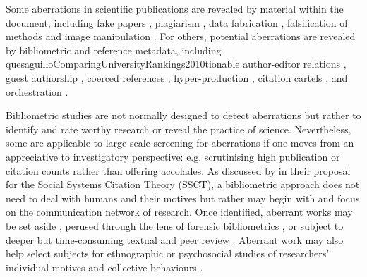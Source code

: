 \documentclass[10pt]{article}
\begin{document}
Some aberrations in scientific publications are revealed by material within the document, including fake papers \citep{elseFightFakepaperFactories2021}, plagiarism \citep{longRespondingPossiblePlagiarism2009}, data fabrication \citep{brownIssuesDataAnalyses2018}, falsification of methods \citep{simonsohnJustPostIt2013} and image manipulation \citep{bikPrevalenceInappropriateImage2016}. For others, potential aberrations are revealed by bibliometric and reference metadata, including quesaguilloComparingUniversityRankings2010tionable author-editor relations \citep{banksElsevierChallengedJournal2009}, guest authorship \citep{khezrVexingPersistentProblem2022}, coerced references \citep{straubJournalSelfCitationVI2009}, hyper-production \citep{ioannidisFeaturesSignalsPrecocious2024a}, citation cartels \citep{safonScreeningArticlesCitation2025}, and orchestration \citep{evdaimonMetricsDetectSmallScale2024}.

Bibliometric studies are not normally designed to detect aberrations but rather to identify and rate worthy research or reveal the practice of science. Nevertheless, some are applicable to large scale screening for aberrations if one moves from an appreciative to investigatory perspective: e.g. scrutinising high publication or citation counts rather than offering accolades. As discussed by \cite{tahamtanSocialSystemsCitation2022} in their proposal for the Social Systems Citation Theory (SSCT), a bibliometric approach does not need to deal with humans and their motives but rather may begin with and focus on the communication network of research. Once identified, aberrant works may be set aside \citep[e.g. in systematic reviews,][]{munnShouldIncludeStudies2021}, perused through the lens of forensic bibliometrics \citep{mcintoshForensicScientometricsAnEmerging2024}, or subject to deeper but time-consuming textual and peer review \citep{kilicogluBiomedicalTextMining2018}. Aberrant work may also help select subjects for ethnographic or psychosocial studies of researchers' individual motives and collective behaviours \citep{martinsonScientistsBehavingBadly2005}.
\end{document}

